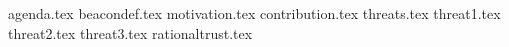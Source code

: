 {agenda.tex}
{beacondef.tex}
{motivation.tex}
{contribution.tex}
{threats.tex}
{threat1.tex}
{threat2.tex}
{threat3.tex}
{rationaltrust.tex}